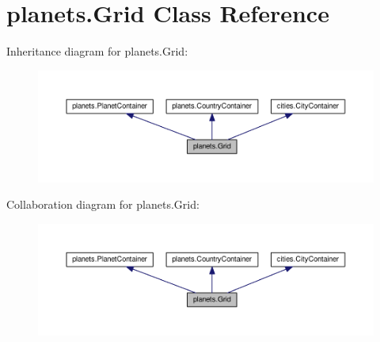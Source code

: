 \hypertarget{classplanets_1_1_grid}{}\section{planets.\+Grid Class Reference}
\label{classplanets_1_1_grid}


Inheritance diagram for planets.\+Grid\+:\nopagebreak
\begin{figure}[H]
\begin{center}
\leavevmode
\includegraphics[width=350pt]{classplanets_1_1_grid__inherit__graph}
\end{center}
\end{figure}


Collaboration diagram for planets.\+Grid\+:\nopagebreak
\begin{figure}[H]
\begin{center}
\leavevmode
\includegraphics[width=350pt]{classplanets_1_1_grid__coll__graph}
\end{center}
\end{figure}
